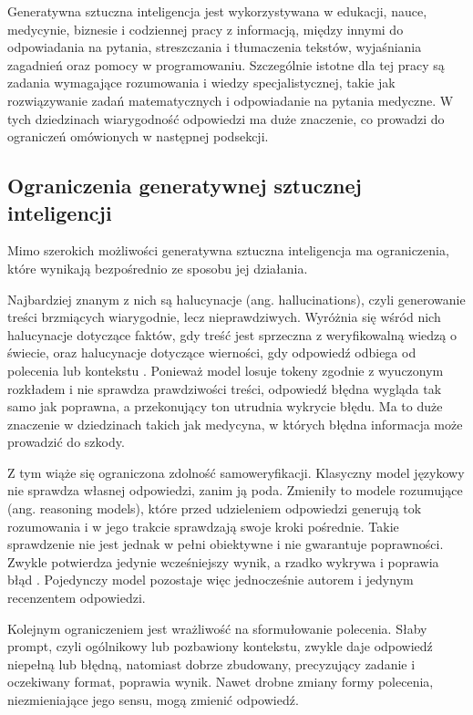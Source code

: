 Generatywna sztuczna inteligencja jest wykorzystywana w edukacji, nauce, medycynie, biznesie i codziennej pracy z informacją, między innymi do odpowiadania na pytania, streszczania i tłumaczenia tekstów, wyjaśniania zagadnień oraz pomocy w programowaniu. Szczególnie istotne dla tej pracy są zadania wymagające rozumowania i wiedzy specjalistycznej, takie jak rozwiązywanie zadań matematycznych i odpowiadanie na pytania medyczne. W tych dziedzinach wiarygodność odpowiedzi ma duże znaczenie, co prowadzi do ograniczeń omówionych w następnej podsekcji.

\subsection{Ograniczenia generatywnej sztucznej inteligencji}

Mimo szerokich możliwości generatywna sztuczna inteligencja ma ograniczenia, które wynikają bezpośrednio ze sposobu jej działania.

Najbardziej znanym z nich są halucynacje (ang. hallucinations), czyli generowanie treści brzmiących wiarygodnie, lecz nieprawdziwych. Wyróżnia się wśród nich halucynacje dotyczące faktów, gdy treść jest sprzeczna z weryfikowalną wiedzą o świecie, oraz halucynacje dotyczące wierności, gdy odpowiedź odbiega od polecenia lub kontekstu \cite{llm_hallucination_survey}. Ponieważ model losuje tokeny zgodnie z wyuczonym rozkładem i nie sprawdza prawdziwości treści, odpowiedź błędna wygląda tak samo jak poprawna, a przekonujący ton utrudnia wykrycie błędu. Ma to duże znaczenie w dziedzinach takich jak medycyna, w których błędna informacja może prowadzić do szkody.

Z tym wiąże się ograniczona zdolność samoweryfikacji. Klasyczny model językowy nie sprawdza własnej odpowiedzi, zanim ją poda. Zmieniły to modele rozumujące (ang. reasoning models), które przed udzieleniem odpowiedzi generują tok rozumowania i w jego trakcie sprawdzają swoje kroki pośrednie. Takie sprawdzenie nie jest jednak w pełni obiektywne i nie gwarantuje poprawności. Zwykle potwierdza jedynie wcześniejszy wynik, a rzadko wykrywa i poprawia błąd \cite{self_verification_dilemma}. Pojedynczy model pozostaje więc jednocześnie autorem i jedynym recenzentem odpowiedzi.

Kolejnym ograniczeniem jest wrażliwość na sformułowanie polecenia. Słaby prompt, czyli ogólnikowy lub pozbawiony kontekstu, zwykle daje odpowiedź niepełną lub błędną, natomiast dobrze zbudowany, precyzujący zadanie i oczekiwany format, poprawia wynik. Nawet drobne zmiany formy polecenia, niezmieniające jego sensu, mogą zmienić odpowiedź.

